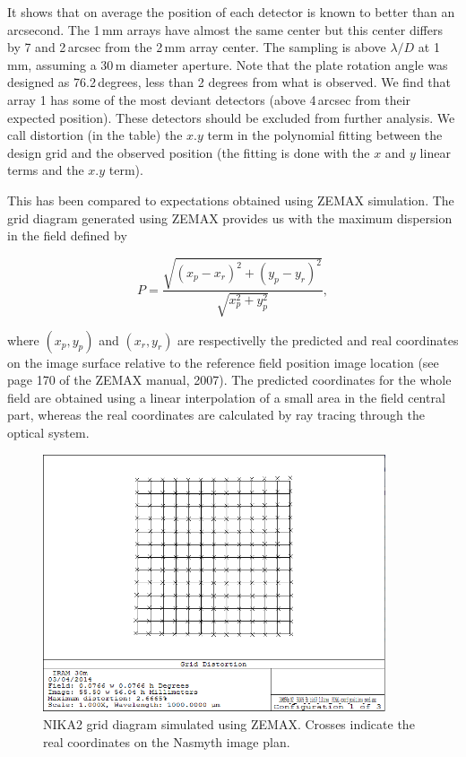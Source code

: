 It shows that on average the position of each detector is known to better than
an arcsecond. The 1\,mm arrays have almost the same center but this center
differs by 7 and 2\,arcsec from the 2\,mm array center. The sampling is above
$\lambda/D$ at 1\,mm, assuming a 30\,m diameter aperture. Note that
the plate rotation angle was designed as 76.2\,degrees, less than 2
degrees from what is observed. We find that array 1
has some of the most deviant detectors (above 4\,arcsec from their expected
position). These detectors should be excluded from further analysis. We call
distortion (in the table) the $x.y$ term in the polynomial fitting between the
design grid and the observed position (the fitting is done with the $x$ and
$y$ linear terms and the $x.y$ term). 

This has been compared to expectations obtained using ZEMAX
simulation. The grid diagram generated using ZEMAX provides us with
the maximum dispersion in the field defined by

\begin{equation}
P = \frac{\sqrt{(x_p - x_r)^2 + (y_p - y_r)^2}}{\sqrt{x_p^2 + y_p^2}},
\end{equation}

where $(x_p, y_p)$ and $(x_r, y_r)$ are respectivelly the predicted
and real coordinates on the image surface relative to the reference
field position image location (see page 170 of the ZEMAX manual, 2007).
The predicted coordinates for the whole field are obtained using a
linear interpolation of a small area in the field central part,
whereas the real coordinates are calculated by ray tracing through the
optical system.

\begin{figure}[ht] 
\begin{center}
\includegraphics[width=0.9\textwidth]{Figures/NIKA2_Final_grid.png}
\caption[Simulated FOV grid]{NIKA2 grid diagram simulated using ZEMAX. Crosses indicate
  the real coordinates on the Nasmyth image plan. }
 \label{fig:fov_grid_distortion_zemax}
\end{center}
\end{figure}

